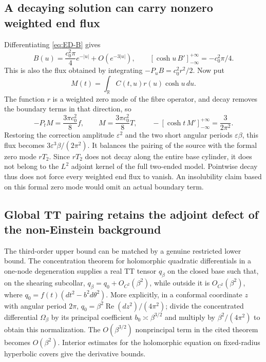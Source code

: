 \documentclass[a4paper,11pt]{article}
\numberwithin{equation}{section}
\theoremstyle{definition}
\newcommand{\R}{\mathbb R}
\begin{document}
\subsection{A decaying solution can carry nonzero weighted end flux}\label{sec:ED-flux}
Differentiating \eqref{eq:ED-B} gives
\begin{equation}\label{eq:ED-B-flux}
B(u)=\frac{c_0^2\pi}{4}e^{-|u|}+O(e^{-3|u|}),\qquad
[\cosh u\,B']_{-\infty}^{+\infty}=-c_0^2\pi/4.
\end{equation}
This is also the flux obtained by integrating $-P_uB=c_0^2r^2/2$.
Now put
\[
M(t)=\int_\R C(t,u)r(u)\cosh u\,du.
\]
The function $r$ is a weighted zero mode of the fibre operator, and decay removes the boundary terms in that direction, so
\[
-P_tM=\frac{3\pi c_0^2}{8}f,\qquad
M=\frac{3\pi c_0^2}{8}T,\qquad
-[\cosh t\,M']_{-\infty}^{+\infty}=\frac3{2\pi^2}.
\]
Restoring the correction amplitude $\varepsilon^2$ and the two short angular periods $\varepsilon\beta$,
this flux becomes $3\varepsilon^3\beta/(2\pi^2)$.
It balances the pairing of the source with the formal zero mode $rT_2$.
Since $rT_2$ does not decay along the entire base cylinder, it does not belong to the $L^2$ adjoint kernel of the full two-ended model.
Pointwise decay thus does not force every weighted end flux to vanish.
An insolubility claim based on this formal zero mode would omit an actual boundary term.

\subsection{Global TT pairing retains the adjoint defect of the non-Einstein background}\label{sec:ED-global-pairing}
The third-order upper bound can be matched by a genuine restricted lower bound.
The concentration theorem for holomorphic quadratic differentials in a one-node degeneration
\cite[Lemma 4.4]{RupflinToppingQuadratic} supplies a real TT tensor
$q_\beta$ on the closed base such that, on the shearing subcollar,
$q_\beta=q_0+O_{C^2}(\beta^2)$, while outside it is $O_{C^2}(\beta^2)$, where
$q_0=f(t)(dt^2-b^2d\theta^2)$.
More explicitly, in a conformal coordinate $z$ with angular period $2\pi$,
$q_0=\beta^2\operatorname{Re}(dz^2)/(4\pi^2)$;
divide the concentrated differential $\Omega_\beta$ by its principal coefficient
$b_0\asymp\beta^{3/2}$ and multiply by $\beta^2/(4\pi^2)$ to obtain this normalization.
The $O(\beta^{3/2})$ nonprincipal term in the cited theorem becomes $O(\beta^2)$.
Interior estimates for the holomorphic equation on fixed-radius hyperbolic covers give the derivative bounds.
\end{document}
